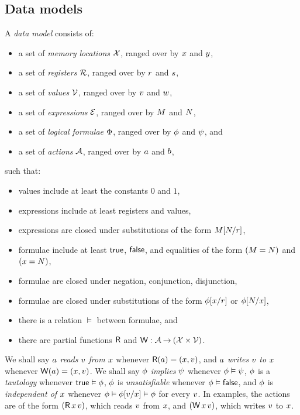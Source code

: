 \documentclass[conference]{IEEEtran}
\theoremstyle{plain}
\theoremstyle{definition}
\begin{document}
\subsection{Data models}
\label{sec:preliminaries}

A \emph{data model} consists of:
\begin{itemize}
\item a set of \emph{memory locations} $\mathcal{X}$, ranged over by
  $x$ and $y$,
\item a set of \emph{registers} $\mathcal{R}$, ranged over by
  $r$ and $s$,
\item a set of \emph{values} $\mathcal{V}$, ranged over by
  $v$ and $w$,
\item a set of \emph{expressions} $\mathcal{E}$, ranged over by
  $M$ and $N$,
\item a set of \emph{logical formulae} $\Phi$, ranged over by
  $\phi$ and $\psi$, and
\item a set of \emph{actions} $\mathcal{A}$, ranged over by $a$ and $b$,
\end{itemize}
such that:
\begin{itemize}
\item values include at least the constants $0$ and $1$,
\item expressions include at least registers and values,
\item expressions are closed under substitutions of the form $M[N/r]$,
\item formulae include at least $\mathsf{true}$, $\mathsf{false}$, and equalities of the form $(M=N)$ and $(x=N)$,
\item formulae are closed under negation, conjunction, disjunction,
\item formulae are closed under substitutions of the form $\phi[x/r]$ or $\phi[N/x]$,
\item there is a relation $\vDash$ between formulae, and
\item there are partial functions $\mathsf{R}$ and $\mathsf{W}: \mathcal{A} \mathbin\rightarrow (\mathcal{X} \times \mathcal{V})$.
\end{itemize}
We shall say $a$ \emph{reads} $v$ \emph{from} $x$ whenever
$\mathsf{R}(a) = (x,v)$, and
$a$ \emph{writes} $v$ \emph{to} $x$ whenever
$\mathsf{W}(a) = (x,v)$.
We shall say $\phi$ \emph{implies} $\psi$ whenever $\phi\vDash\psi$,
$\phi$ is a \emph{tautology} whenever $\mathsf{true}\vDash\phi$,
$\phi$ is \emph{unsatisfiable} whenever $\phi\vDash\mathsf{false}$, and
$\phi$ is \emph{independent of $x$} whenever $\phi \vDash \phi[v/x] \vDash \phi$ for every $v$.
In examples, the actions are of the form $(\DR{\aLoc}{\aVal})$, which reads $v$ from $x$,
and $(\DW{\aLoc}{\aVal})$, which writes $v$ to $x$.
\end{document}

